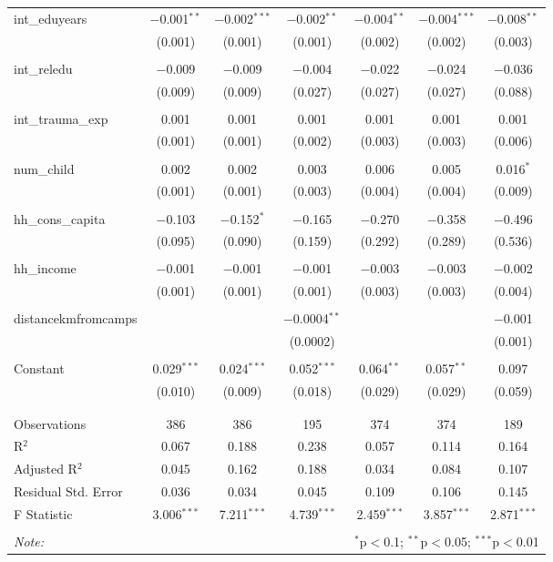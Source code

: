 \begin{table}[H]
\begin{tabular}{@{\extracolsep{4pt}}lcccccc}
 int\_eduyears & $-$0.001$^{**}$ & $-$0.002$^{***}$ & $-$0.002$^{**}$ & $-$0.004$^{**}$ & $-$0.004$^{***}$ & $-$0.008$^{**}$ \\ 
  & (0.001) & (0.001) & (0.001) & (0.002) & (0.002) & (0.003) \\ 
  & & & & & & \\ 
 int\_reledu & $-$0.009 & $-$0.009 & $-$0.004 & $-$0.022 & $-$0.024 & $-$0.036 \\ 
  & (0.009) & (0.009) & (0.027) & (0.027) & (0.027) & (0.088) \\ 
  & & & & & & \\ 
 int\_trauma\_exp & 0.001 & 0.001 & 0.001 & 0.001 & 0.001 & 0.001 \\ 
  & (0.001) & (0.001) & (0.002) & (0.003) & (0.003) & (0.006) \\ 
  & & & & & & \\ 
 num\_child & 0.002 & 0.002 & 0.003 & 0.006 & 0.005 & 0.016$^{*}$ \\ 
  & (0.001) & (0.001) & (0.003) & (0.004) & (0.004) & (0.009) \\ 
  & & & & & & \\ 
 hh\_cons\_capita & $-$0.103 & $-$0.152$^{*}$ & $-$0.165 & $-$0.270 & $-$0.358 & $-$0.496 \\ 
  & (0.095) & (0.090) & (0.159) & (0.292) & (0.289) & (0.536) \\ 
  & & & & & & \\ 
 hh\_income & $-$0.001 & $-$0.001 & $-$0.001 & $-$0.003 & $-$0.003 & $-$0.002 \\ 
  & (0.001) & (0.001) & (0.001) & (0.003) & (0.003) & (0.004) \\ 
  & & & & & & \\ 
 distancekmfromcamps &  &  & $-$0.0004$^{**}$ &  &  & $-$0.001 \\ 
  &  &  & (0.0002) &  &  & (0.001) \\ 
  & & & & & & \\ 
 Constant & 0.029$^{***}$ & 0.024$^{***}$ & 0.052$^{***}$ & 0.064$^{**}$ & 0.057$^{**}$ & 0.097 \\ 
  & (0.010) & (0.009) & (0.018) & (0.029) & (0.029) & (0.059) \\ 
  & & & & & & \\ 
\hline \\[-1.8ex] 
Observations & 386 & 386 & 195 & 374 & 374 & 189 \\ 
R$^{2}$ & 0.067 & 0.188 & 0.238 & 0.057 & 0.114 & 0.164 \\ 
Adjusted R$^{2}$ & 0.045 & 0.162 & 0.188 & 0.034 & 0.084 & 0.107 \\ 
Residual Std. Error & 0.036 & 0.034 & 0.045 & 0.109 & 0.106 & 0.145 \\ 
F Statistic & 3.006$^{***}$ & 7.211$^{***}$ & 4.739$^{***}$ & 2.459$^{***}$ & 3.857$^{***}$ & 2.871$^{***}$ \\ 
\hline 
\hline \\[-1.8ex] 
\textit{Note:}  & \multicolumn{6}{r}{$^{*}$p$<$0.1; $^{**}$p$<$0.05; $^{***}$p$<$0.01} \\ 
\end{tabular} 
\end{table} 
